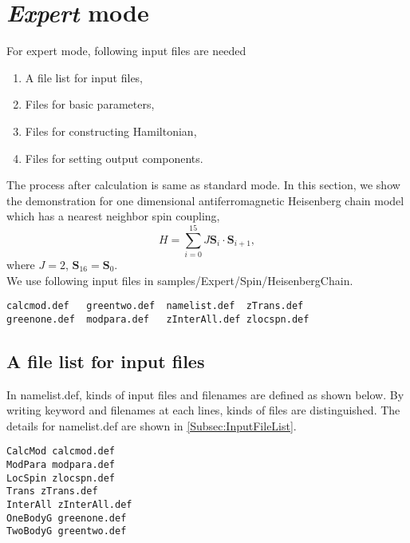 \section{{\it Expert} mode}
For expert mode, following input files are needed
\begin{enumerate}
\item A file list for input files,
\item Files for basic parameters,
\item Files for constructing Hamiltonian,
\item Files for setting output components.
\end{enumerate}
The process after calculation is same as standard mode. In this section, we show the demonstration for one dimensional antiferromagnetic Heisenberg chain model which has a nearest neighbor spin coupling, 
\begin{equation}
H=\sum_{i=0}^{15} J {\bm S}_i\cdot {\bm S}_{i+1},
\end{equation}
where $J=2$, ${\bm S}_{16}={\bm S}_{0}$.\\
We use following input files in samples/Expert/Spin/HeisenbergChain.\\
\begin{minipage}{15cm}
\begin{screen}
\begin{verbatim}
calcmod.def   greentwo.def  namelist.def  zTrans.def
greenone.def  modpara.def   zInterAll.def zlocspn.def
\end{verbatim}
\end{screen}
\end{minipage}

\subsection{A file list for input files}
In namelist.def, kinds of input files and filenames are defined as shown below.
By writing keyword and filenames at each lines, kinds of files are distinguished. The details for namelist.def are shown in  \ref{Subsec:InputFileList}.
\\
\begin{minipage}{15cm}
\begin{screen}
\begin{verbatim}
CalcMod calcmod.def
ModPara modpara.def
LocSpin zlocspn.def
Trans zTrans.def
InterAll zInterAll.def
OneBodyG greenone.def
TwoBodyG greentwo.def
\end{verbatim}
\end{screen}
\end{minipage}

